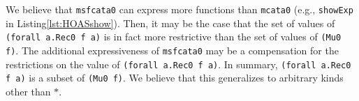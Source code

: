 We believe that \lstinline{msfcata0} can
express more functions than \lstinline{mcata0} (e.g., \lstinline{showExp}
in Listing\;\ref{lst:HOASshow}). Then, it may be the case that the set of
values of \lstinline{(forall a.Rec0 f a)} is in fact more restrictive than
the set of values of \lstinline{(Mu0 f)}. The additional expressiveness of
\lstinline{msfcata0} may be a compensation for the restrictions on
the value of \lstinline{(forall a.Rec0 f a)}. In summary, 
\lstinline{(forall a.Rec0 f a)} is a subset of \lstinline{(Mu0 f)}.
We believe that this generalizes to arbitrary kinds other than $*$.

